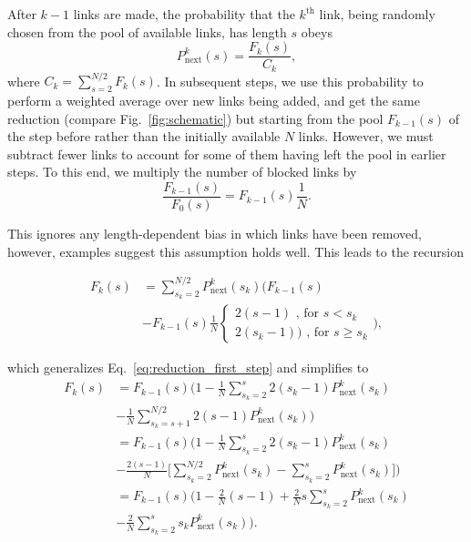 \documentclass[
reprint,
twocolumn,
amsmath,amssymb,superscriptaddress,aps,
pre]{revtex4-1}
\newcommand{\Pin}{P_{\mathrm{next}}}
\begin{document}
After $k-1$ links are made, the probability that the $k^{\mathrm{th}}$ link, being randomly chosen from the pool of available links, has length $s$ obeys
\begin{equation}
    \Pin^k(s)=\frac{F_k(s)}{C_k},
\end{equation}
where $C_k=\sum_{s=2}^{N/2}F_k(s)$. In subsequent steps, we use this probability to perform a weighted average over new links being added, and get the same reduction (compare Fig.~\ref{fig:schematic}) but starting from the pool $F_{k-1}(s)$ of the step before rather than the initially available $N$ links. However, we must subtract fewer links to account for some of them having left the pool in earlier steps. To this end, we multiply the number of blocked links by
\begin{equation}
    \frac{F_{k-1}(s)}{F_0(s)} = F_{k-1}(s)\frac{1}{N}.
    \label{eq.Pk}
\end{equation}

This ignores any length-dependent bias in which links have been removed, however, examples suggest this assumption holds well. 
This leads to the recursion

\begin{align}
    F_k(s)&= \sum_{s_k=2}^{N/2} \Pin^k(s_k)\nonumber \bigg(F_{k-1}(s) \\
    & - F_{k-1}(s)\frac{1}{N}
    {\begin{cases}
     2(s-1) \text{ , for } s<s_k\\
     2(s_k -1))\text{ , for } s\geq s_k
    \end{cases}}\bigg),
\end{align}

which generalizes Eq.~\ref{eq:reduction_first_step} and simplifies to
\begin{align}
   F_k(s)&=F_{k-1}(s)\Big(1-\frac{1}{N} \sum_{s_k=2}^{s} 2 (s_k-1) \Pin^k(s_k)\nonumber \\
   &-\frac{1}{N} \sum_{s_k=s+1}^{N/2} 2 (s-1) \Pin^k(s_k)\Big)\nonumber \\
   &=F_{k-1}(s)\bigg(1-\frac{1}{N}
   \sum_{s_k=2}^{s} 2 (s_k-1) \Pin^k(s_k)\nonumber \\
   &-\frac{2 (s-1)}{N} \Big[\sum_{s_k=2}^{N/2} \Pin^k(s_k) - \sum_{s_k=2}^{s} \Pin^k(s_k)\Big]\bigg)\nonumber \\
   &=F_{k-1}(s)\Big(1-\frac{2}{N} (s-1) 
   +\frac{2}{N} s
   \sum_{s_k=2}^{s}\Pin^k(s_k)\nonumber \\
   &-\frac{2}{N}
   \sum_{s_k=2}^{s} s_k \Pin^k(s_k)\Big).
   \label{eq.Fk_rec}
\end{align}
\end{document}
